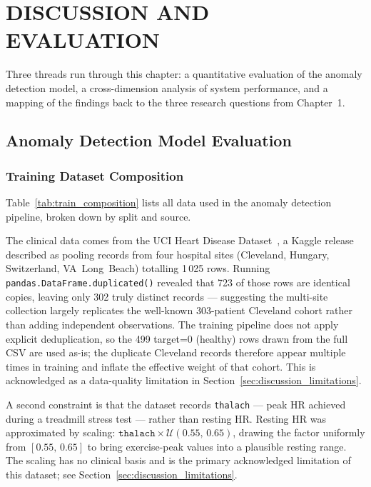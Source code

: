 \chapter{DISCUSSION AND EVALUATION}

Three threads run through this chapter: a quantitative evaluation of the anomaly detection model, a cross-dimension analysis of system performance, and a mapping of the findings back to the three research questions from Chapter~1.

\section{Anomaly Detection Model Evaluation}
\label{sec:ml_validation}

\subsection{Training Dataset Composition}

Table~\ref{tab:train_composition} lists all data used in the anomaly
detection pipeline, broken down by split and source.

The clinical data comes from the UCI Heart Disease Dataset~\cite{UCIHeartDisease1988}, a Kaggle release described as pooling records from four hospital sites (Cleveland, Hungary, Switzerland, VA~Long~Beach) totalling 1\,025 rows. Running \texttt{pandas.DataFrame.duplicated()} revealed that 723 of those rows are identical copies, leaving only 302 truly distinct records --- suggesting the multi-site collection largely replicates the well-known 303-patient Cleveland cohort rather than adding independent observations. The training pipeline does not apply explicit deduplication, so the 499 target=0 (healthy) rows drawn from the full CSV are used as-is; the duplicate Cleveland records therefore appear multiple times in training and inflate the effective weight of that cohort. This is acknowledged as a data-quality limitation in Section~\ref{sec:discussion_limitations}.

A second constraint is that the dataset records \texttt{thalach} --- peak HR achieved during a treadmill stress test --- rather than resting HR. Resting HR was approximated by scaling: $\texttt{thalach} \times \mathcal{U}(0.55,\,0.65)$, drawing the factor uniformly from $[0.55,\,0.65]$ to bring exercise-peak values into a plausible resting range. The scaling has no clinical basis and is the primary acknowledged limitation of this dataset; see Section~\ref{sec:discussion_limitations}.

